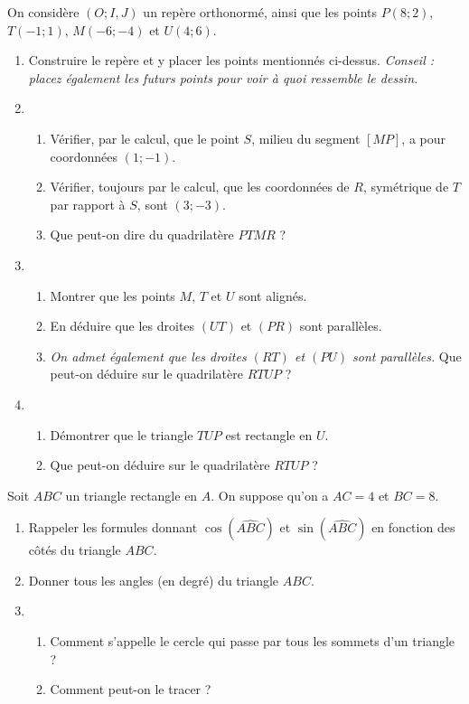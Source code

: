 \documentclass[11pt]{article}
\begin{document}
\begin{exo}[$8$ points]
  On considère $(O; I, J)$ un repère orthonormé, ainsi que les points $P(8; 2)$,
  $T(-1; 1)$, $M(-6; -4)$ et $U(4; 6)$.
  \begin{enumerate}
    \item Construire le repère et y placer les points mentionnés ci-dessus.
      \emph{Conseil : placez également les futurs points pour voir à quoi
      ressemble le dessin.}
    \item \begin{enumerate}
        \item Vérifier, par le calcul, que le point $S$, milieu du segment
          $\left[ MP \right]$, a pour coordonnées $(1; -1)$.
        \item Vérifier, toujours par le calcul, que les coordonnées de $R$,
          symétrique de $T$ par rapport à $S$, sont $(3; -3)$.
        \item Que peut-on dire du quadrilatère $PTMR$ ?
      \end{enumerate}
    \item \begin{enumerate}
        \item Montrer que les points $M$, $T$ et $U$ sont alignés. 
        \item En déduire que les droites $\left( UT \right)$ et $\left( PR
          \right)$ sont parallèles.
        \item \emph{On admet également que les droites $(RT)$ et $(PU)$ sont
          parallèles.} Que peut-on déduire sur le quadrilatère $RTUP$ ?
      \end{enumerate}
    \item \begin{enumerate}
        \item Démontrer que le triangle $TUP$ est rectangle en $U$.
        \item Que peut-on déduire sur le quadrilatère $RTUP$ ?
      \end{enumerate}
  \end{enumerate}
\end{exo}

\begin{exo}[$3$ points]
  Soit $ABC$ un triangle rectangle en $A$. On suppose qu'on a $AC=4$ et $BC=8$.
  \begin{enumerate}
    \item Rappeler les formules donnant $\cos\left( \widehat{ABC} \right)$ et
      $\sin\left( \widehat{ABC} \right)$ en fonction des côtés du triangle
      $ABC$.
    \item Donner tous les angles (en degré) du triangle $ABC$.
    \item \begin{enumerate}
        \item Comment s'appelle le cercle qui passe par tous les sommets d'un
          triangle ?
        \item Comment peut-on le tracer ?
      \end{enumerate}
  \end{enumerate}
\end{exo}
\end{document}
